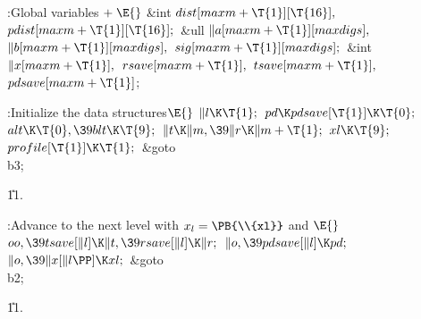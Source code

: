 \fi

\B{}:Global variables\X${}\mathrel+\E{}$\6
\&{int} ${}\\{dist}[\\{maxm}+\T{1}][\T{16}],{}$ ${}\\{pdist}[\\{maxm}+\T{1}][%
\T{16}];{}$\6
\&{ull} ${}\|a[\\{maxm}+\T{1}][\\{maxdigs}],{}$ ${}\|b[\\{maxm}+\T{1}][%
\\{maxdigs}],{}$ ${}\\{sig}[\\{maxm}+\T{1}][\\{maxdigs}];{}$\6
\&{int} ${}\|x[\\{maxm}+\T{1}],{}$ ${}\\{rsave}[\\{maxm}+\T{1}],{}$ ${}%
\\{tsave}[\\{maxm}+\T{1}],{}$ ${}\\{pdsave}[\\{maxm}+\T{1}]{}$;\par
\fi

\B{}:Initialize the data structures\X${}\E{}$\6
$\|l\K\T{1};{}$\6
${}\\{pd}\K\\{pdsave}[\T{1}]\K\T{0};{}$\6
${}\\{alt}\K\T{0},\39\\{blt}\K\T{9};{}$\6
${}\|t\K\|m,\39\|r\K\|m+\T{1};{}$\6
${}\\{xl}\K\T{9};{}$\6
${}\\{profile}[\T{1}]\K\T{1};{}$\6
\&{goto} \\{b3};%
\par
\U11.\fi

\B{}:Advance to the next level with $x_l=\PB{\\{xl}}$
and \X${}\E{}$\6
$\\{oo},\39\\{tsave}[\|l]\K\|t,\39\\{rsave}[\|l]\K\|r;{}$\6
${}\|o,\39\\{pdsave}[\|l]\K\\{pd};{}$\6
${}\|o,\39\|x[\|l\PP]\K\\{xl};{}$\6
\&{goto} \\{b2};\par
\U11.\fi

